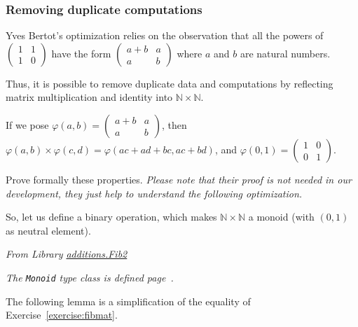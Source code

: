 \subsubsection{Removing duplicate computations}
\label{sect:fibonacci-mul2}


Yves Bertot's optimization relies on the observation that all the powers of
\(  \left(
  \begin{array}{cc}
    1 & 1 \\
    1 & 0 
  \end{array}
\right) \) have the form 
\(  \left(
  \begin{array}{cc}
    a+b  & a \\
    a & b
  \end{array}
\right) \) where $a$ and $b$ are natural numbers.

Thus, it is possible to remove duplicate data and computations by reflecting matrix multiplication and identity into $\mathbb{N}\times\mathbb{N}$.

If we pose $\varphi(a,b) =\left(
  \begin{array}{cc}
    a+b  & a \\
    a & b
  \end{array}
\right)$, then $\varphi(a,b)\times \varphi(c,d)=\varphi(ac + ad + bc, ac + bd)$, and
$\varphi(0,1)=  \left(
  \begin{array}{cc}
    1 & 0 \\
    0 & 1 
  \end{array}
\right) $.

\begin{exercise}
  Prove formally these properties. \emph{Please note that their proof is not needed in our development, they just help to understand the following optimization.}
\end{exercise}


So, let us define a binary operation, which makes $\mathbb{N}\times\mathbb{N}$ a monoid (with $(0,1)$ as neutral element).


\emph{From Library
\href{../theories/html/additions.Fib2.html}{additions.Fib2}} 

\emph{The \texttt{Monoid} type class is defined 
page~\pageref{sect:monoid-def}.}



The following lemma is a simplification of the equality of Exercise~\ref{exercise:fibmat}.



